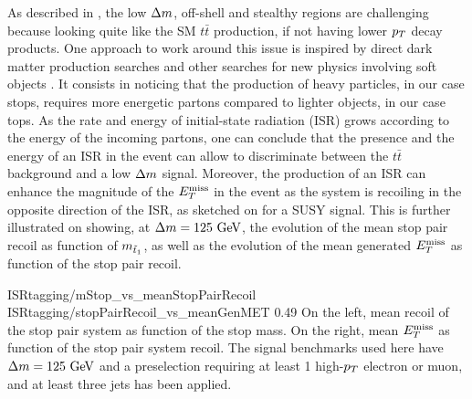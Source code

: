         As described in , the low $\Delta m$,
        off-shell and stealthy regions are challenging because looking quite like the SM
        $t\bar{t}$ production, if not having lower $p_T$ decay products. One approach to
        work around this issue is inspired by direct dark matter production searches \cite{EXOmonojet}
        and other searches for new physics involving soft objects \cite{SUScompressedStop}. It consists in noticing that
        the production of heavy particles, in our case stops, requires more energetic
        partons compared to lighter objects, in our case tops. As the rate and energy of
        initial-state radiation (ISR) grows according to the energy of the incoming partons,
        one can conclude that the presence and
        the energy of an ISR in the event can allow to discriminate between the $t\bar{t}$
        background and a low $\Delta m$ signal. Moreover, the production of an ISR can enhance
        the magnitude of the $E_T^\text{miss}$ in the event as the system is recoiling in the opposite
        direction of the ISR, as sketched on  for a
        SUSY signal. This is further illustrated on  showing, at
        $\Delta m = 125~\text{GeV}$, the evolution of the mean stop pair recoil as function
        of $m_{\tilde{t}_1}$, as well as the evolution of the mean generated $E_T^\text{miss}$ as function
        of the stop pair recoil.


                         {ISRtagging/mStop_vs_meanStopPairRecoil}
                         {ISRtagging/stopPairRecoil_vs_meanGenMET}
                         {0.49}
                         {On the left, mean recoil of the stop pair system as function
                         of the stop mass.
                         On the right, mean $E_T^\text{miss}$ as function of the stop pair system recoil.
                         The signal benchmarks used here have $\Delta m = 125~\text{GeV}$ and a
                         preselection requiring at least 1 high-$p_T$ electron or muon,
                         and at least three jets has been applied.}

